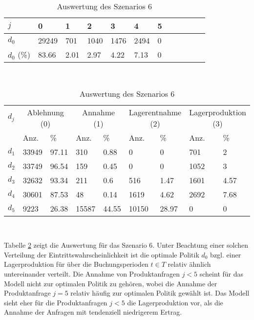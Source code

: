 \begin{table}[h!]
\renewcommand{\arraystretch}{1.5}
  \begin{center}
    \caption{Auswertung des Szenarios 6}  \label{AS6}
    \vspace*{3mm}
    \begin{tabular}{l l l l l l l l l l l l }  \hline 
         $j$ & 0 & 1  & 2 & 3 & 4  & 5   \\  \hline
$d_{0}$ &  29249 &   701 &  1040 &  1476 &  2494 &  0 \\
$d_{0}$ (\%) &  83.66 &  2.01 &  2.97 &  4.22 &  7.13 &  0 \\
\hline
    \end{tabular} \\[3mm]
        \begin{tabular}{ l l l l l l l l l}   \hline    %
    $d_j$ & \multicolumn{2}{c}{Ablehnung (0)} & \multicolumn{2}{c}{Annahme (1)}  & \multicolumn{2}{c}{Lagerentnahme (2)} & \multicolumn{2}{c}{Lagerproduktion (3)}\\
    & Anz. & \% & Anz. & \% & Anz. & \% & Anz. & \% \\ \hline 
$d_{1}$ &  33949 &  97.11 &    310 &   0.88 &    0 &    0 &   701 &     2 \\
$d_{2}$ &  33749 &  96.54 &    159 &   0.45 &    0 &    0 &  1052 &     3 \\ 
$d_{3}$ &  32632 &  93.34 &    211 &    0.6 &    516 &   1.47 &  1601 &  4.57 \\
$d_{4}$ &  30601 &  87.53 &     48 &   0.14 &   1619 &   4.62 &  2692 &  7.68 \\
$d_{5}$ &   9223 &  26.38 &  15587 &  44.55 &  10150 &  28.97 &   0 &   0 \\
          \hline
   \end{tabular} \\[3mm]
     \end{center}
\end{table}

Tabelle \ref{AS6} zeigt die Auswertung für das Szenario 6. Unter Beachtung einer solchen Verteilung der Eintrittswahrscheinlichkeit ist die optimale Politik $d_0$ bzgl. einer Lagerproduktion für über die Buchungsperioden $t\in T$ relativ ähnlich untereinander verteilt. Die Annahme von Produktanfragen $j<5$ scheint für das Modell nicht zur optimalen Politik zu gehören, wobei die Annahme der Produktanfrage $j=5$ relativ häufig zur optimalen Politik gewählt ist. Das Modell sieht eher für die Produktanfragen $j<5$ die Lagerproduktion vor, als die Annahme der Anfragen mit tendenziell niedrigerem Ertrag. %

